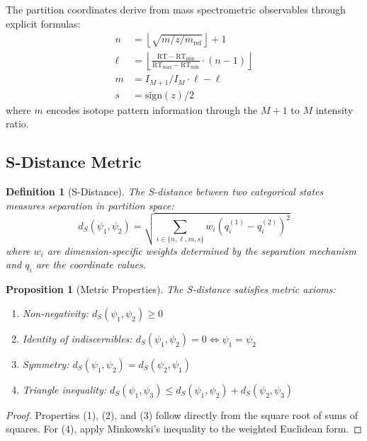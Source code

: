 \documentclass[twocolumn,10pt]{article}
\newtheorem{definition}[theorem]{Definition}
\newtheorem{proposition}[theorem]{Proposition}
\begin{document}
The partition coordinates derive from mass spectrometric observables through explicit formulas:
\begin{align}
n &= \left\lfloor \sqrt{m/z / m_{\text{ref}}} \right\rfloor + 1 \\
\ell &= \left\lfloor \frac{\text{RT} - \text{RT}_{\min}}{\text{RT}_{\max} - \text{RT}_{\min}} \cdot (n-1) \right\rfloor \\
m &= I_{M+1}/I_M \cdot \ell - \ell \\
s &= \text{sign}(z)/2
\end{align}
where $m$ encodes isotope pattern information through the $M+1$ to $M$ intensity ratio.

\subsection{S-Distance Metric}

\begin{definition}[S-Distance]
\label{def:sdistance}
The S-distance between two categorical states measures separation in partition space:
\begin{equation}
d_S(\psi_1, \psi_2) = \sqrt{\sum_{i \in \{n,\ell,m,s\}} w_i (q_i^{(1)} - q_i^{(2)})^2}
\end{equation}
where $w_i$ are dimension-specific weights determined by the separation mechanism and $q_i$ are the coordinate values.
\end{definition}

\begin{proposition}[Metric Properties]
\label{prop:metric}
The S-distance satisfies metric axioms:
\begin{enumerate}
    \item Non-negativity: $d_S(\psi_1, \psi_2) \geq 0$
    \item Identity of indiscernibles: $d_S(\psi_1, \psi_2) = 0 \iff \psi_1 = \psi_2$
    \item Symmetry: $d_S(\psi_1, \psi_2) = d_S(\psi_2, \psi_1)$
    \item Triangle inequality: $d_S(\psi_1, \psi_3) \leq d_S(\psi_1, \psi_2) + d_S(\psi_2, \psi_3)$
\end{enumerate}
\end{proposition}

\begin{proof}
Properties (1), (2), and (3) follow directly from the square root of sums of squares. For (4), apply Minkowski's inequality to the weighted Euclidean form.
\end{proof}
\end{document}
